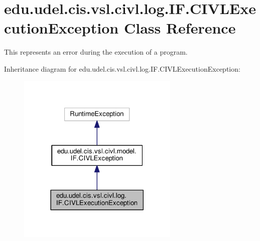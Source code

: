 \hypertarget{classedu_1_1udel_1_1cis_1_1vsl_1_1civl_1_1log_1_1IF_1_1CIVLExecutionException}{}\section{edu.\+udel.\+cis.\+vsl.\+civl.\+log.\+I\+F.\+C\+I\+V\+L\+Execution\+Exception Class Reference}
\label{classedu_1_1udel_1_1cis_1_1vsl_1_1civl_1_1log_1_1IF_1_1CIVLExecutionException}


This represents an error during the execution of a program.  




Inheritance diagram for edu.\+udel.\+cis.\+vsl.\+civl.\+log.\+I\+F.\+C\+I\+V\+L\+Execution\+Exception\+:
\nopagebreak
\begin{figure}[H]
\begin{center}
\leavevmode
\includegraphics[width=218pt]{classedu_1_1udel_1_1cis_1_1vsl_1_1civl_1_1log_1_1IF_1_1CIVLExecutionException__inherit__graph}
\end{center}
\end{figure}


